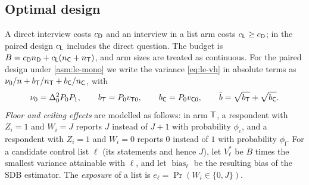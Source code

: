 \subsection{Optimal design}\label{app:pd-design}

A direct interview costs $c_{\mathsf{D}}$ and an interview in a list arm costs $c_{\mathsf{L}}\ge c_{\mathsf{D}}$; in the paired design $c_{\mathsf{L}}$ includes the direct question. The budget is $B=c_{\mathsf{D}}n_{\mathsf{D}}+c_{\mathsf{L}}(n_{\mathsf{C}}+n_{\mathsf{T}})$, and arm sizes are treated as continuous. For the paired design under \cref{asm:le-mono} we write the variance \eqref{eq:le-vh} in absolute terms as $\nu_0/n+b_{\mathsf{T}}/n_{\mathsf{T}}+b_{\mathsf{C}}/n_{\mathsf{C}}$, with
\[
  \nu_0=\Delta_0^2P_0P_1,\qquad b_{\mathsf{T}}=P_0v_{\mathsf{T}0},\qquad b_{\mathsf{C}}=P_0v_{\mathsf{C}0},\qquad \bar b=\sqrt{b_{\mathsf{T}}}+\sqrt{b_{\mathsf{C}}}.
\]
\emph{Floor and ceiling effects} \citep{blair2012} are modelled as follows: in arm $\mathsf{T}$, a respondent with $Z_i=1$ and $W_i=J$ reports $J$ instead of $J+1$ with probability $\phi_{\mathrm c}$, and a respondent with $Z_i=1$ and $W_i=0$ reports $0$ instead of $1$ with probability $\phi_{\mathrm f}$. For a candidate control list $\ell$ (its statements and hence $J$), let $V^*_\ell$ be $B$ times the smallest variance attainable with $\ell$, and let $\operatorname{bias}_\ell$ be the resulting bias of the SDB estimator. The \emph{exposure} of a list is $e_\ell=\Pr(W_i\in\{0,J\})$.

